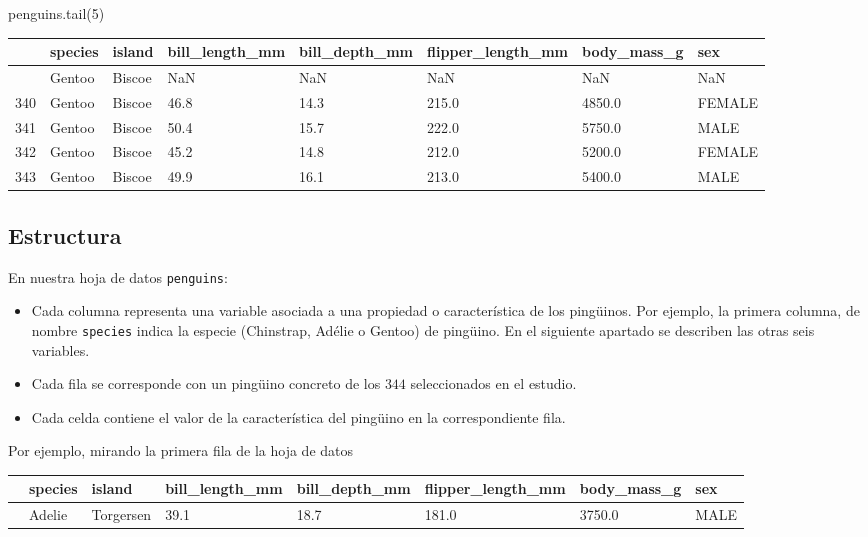 \documentclass[
  a4paper,
  noprof,
  12pt,
  notoc,
  nosols,
  nobib]{mnye}
\newenvironment{Shaded}{\begin{snugshade}}{\end{snugshade}}
\newcommand{\DecValTok}[1]{\textcolor[rgb]{0.68,0.00,0.00}{#1}}
\newcommand{\NormalTok}[1]{\textcolor[rgb]{0.00,0.23,0.31}{#1}}
\theoremstyle{definition}
\theoremstyle{remark}
\begin{document}
\begin{Shaded}
\begin{Highlighting}[]
\NormalTok{penguins.tail(}\DecValTok{5}\NormalTok{)}
\end{Highlighting}
\end{Shaded}

\begin{longtable}[]{@{}llllllll@{}}
\toprule\noalign{}
& species & island & bill\_length\_mm & bill\_depth\_mm &
flipper\_length\_mm & body\_mass\_g & sex \\
\midrule\noalign{}
\endhead
\bottomrule\noalign{}
\endlastfoot
339 & Gentoo & Biscoe & NaN & NaN & NaN & NaN & NaN \\
340 & Gentoo & Biscoe & 46.8 & 14.3 & 215.0 & 4850.0 & FEMALE \\
341 & Gentoo & Biscoe & 50.4 & 15.7 & 222.0 & 5750.0 & MALE \\
342 & Gentoo & Biscoe & 45.2 & 14.8 & 212.0 & 5200.0 & FEMALE \\
343 & Gentoo & Biscoe & 49.9 & 16.1 & 213.0 & 5400.0 & MALE \\
\end{longtable}

\subsection{Estructura}\label{estructura}

En nuestra hoja de datos \texttt{penguins}:

\begin{itemize}
\item
  Cada columna representa una variable asociada a una propiedad o
  característica de los pingüinos. Por ejemplo, la primera columna, de
  nombre \texttt{species} indica la especie (Chinstrap, Adélie o Gentoo)
  de pingüino. En el siguiente apartado se describen las otras seis
  variables.
\item
  Cada fila se corresponde con un pingüino concreto de los \(344\)
  seleccionados en el estudio.
\item
  Cada celda contiene el valor de la característica del pingüino en la
  correspondiente fila.
\end{itemize}

Por ejemplo, mirando la primera fila de la hoja de datos

\begin{longtable}[]{@{}llllllll@{}}
\toprule\noalign{}
& species & island & bill\_length\_mm & bill\_depth\_mm &
flipper\_length\_mm & body\_mass\_g & sex \\
\midrule\noalign{}
\endhead
\bottomrule\noalign{}
\endlastfoot
0 & Adelie & Torgersen & 39.1 & 18.7 & 181.0 & 3750.0 & MALE \\
\end{longtable}
\end{document}
